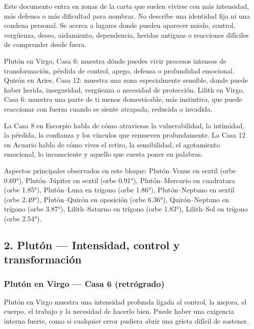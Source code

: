 \documentclass[11pt,a4paper]{article}
\begin{document}
Este documento entra en zonas de la carta que suelen vivirse con más intensidad, más defensa o más dificultad para nombrar. No describe una identidad fija ni una condena personal. Se acerca a lugares donde pueden aparecer miedo, control, vergüenza, deseo, aislamiento, dependencia, heridas antiguas o reacciones difíciles de comprender desde fuera.

Plutón en Virgo, Casa 6: muestra dónde puedes vivir procesos intensos de transformación, pérdida de control, apego, defensa o profundidad emocional.
Quirón en Aries, Casa 12: muestra una zona especialmente sensible, donde puede haber herida, inseguridad, vergüenza o necesidad de protección.
Lilith en Virgo, Casa 6: muestra una parte de ti menos domesticable, más instintiva, que puede reaccionar con fuerza cuando se siente atrapada, reducida o invadida.

La Casa 8 en Escorpio habla de cómo atraviesas la vulnerabilidad, la intimidad, la pérdida, la confianza y los vínculos que remueven profundamente.
La Casa 12 en Acuario habla de cómo vives el retiro, la sensibilidad, el agotamiento emocional, lo inconsciente y aquello que cuesta poner en palabras.

Aspectos principales observados en este bloque: Plutón–Venus en sextil (orbe 0.69°), Plutón–Júpiter en sextil (orbe 0.91°), Plutón–Mercurio en cuadratura (orbe 1.85°), Plutón–Luna en trígono (orbe 1.86°), Plutón–Neptuno en sextil (orbe 2.49°), Plutón–Quirón en oposición (orbe 6.36°), Quirón–Neptuno en trígono (orbe 3.87°), Lilith–Saturno en trígono (orbe 1.83°), Lilith–Sol en trígono (orbe 2.54°).

\vspace{0.4cm}

\subsection{2. Plutón — Intensidad, control y transformación}

\subsubsection*{Plutón en Virgo — Casa 6 (retrógrado)}

Plutón en Virgo muestra una intensidad profunda ligada al control, la mejora, el cuerpo, el trabajo y la necesidad de hacerlo bien. Puede haber una exigencia interna fuerte, como si cualquier error pudiera abrir una grieta difícil de sostener.
\end{document}
